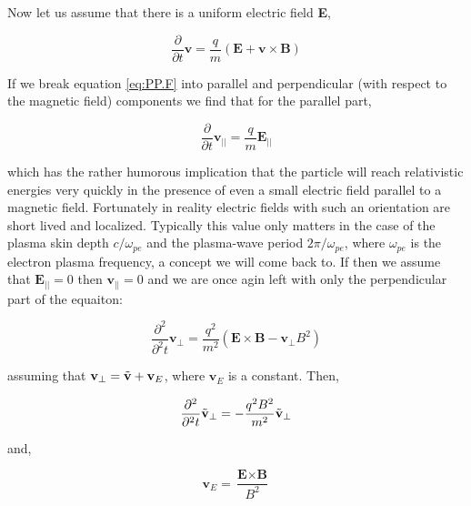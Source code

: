 \documentclass[utf8]{report}
\begin{document}
Now let us assume that there is a uniform electric field \textbf{E}, 

\begin{equation}
    \frac{\partial }{\partial t} \textbf{v} = \frac{q}{m} (\textbf{E} + \textbf{v} \times \textbf{B}) 
    \label{eq:PP.J}
\end{equation}

If we break equation \ref{eq:PP.F} into parallel and perpendicular (with respect to the magnetic field) components we find that for the parallel part, 

\begin{equation}
    \frac{\partial }{\partial t} \textbf{v}_{||} = \frac{q}{m} \textbf{E}_{||}
    \label{eq:PP.K}
\end{equation}

which has the rather humorous implication that the particle will reach relativistic energies very quickly in the presence of even a small electric field parallel to a magnetic field. Fortunately in reality electric fields  with such an orientation are short lived and localized. Typically this value only matters in the case of the plasma skin depth $c / \omega_{pe}$ and the plasma-wave period $2\pi / \omega_{pe}$, where $\omega_{pe}$ is the electron plasma frequency, a concept we will come back to. If then we assume that $\textbf{E}_{||} = 0$ then $\textbf{v}_{||} = 0$ and we are once agin left with only the perpendicular part of the equaiton: 

\begin{equation}
    \frac{\partial^{2} }{\partial^{2} t} \textbf{v}_{\perp} = \frac{q^{2}}{m^{2}} (\textbf{E} \times \textbf{B} - \textbf{v}_{\perp}B^{2})
    \label{eq:PP.L}
\end{equation}

assuming that $\textbf{v}_{\perp} = \Tilde{\textbf{v}} + \textbf{v}_{E}$, where $\textbf{v}_{E}$ is a constant. Then, 

\begin{equation}
    \frac{\partial^{2} }{\partial^{2} t} \Tilde{\textbf{v}}_{\perp} = - \frac{q^{2}B^{2}}{m^{2}} \Tilde{\textbf{v}}_{\perp}
    \label{eq:PP.M}
\end{equation}

and, 

\begin{equation}
    \textbf{v}_{E} = \frac{\textbf{E}\times\textbf{B}}{B^{2}}
    \label{eq:PP.N}
\end{equation}
\end{document}
